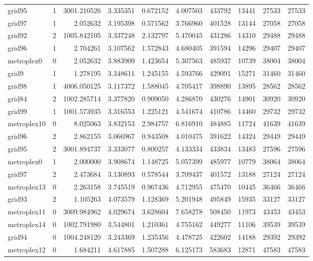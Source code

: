 \documentclass[../../../thesis.tex]{subfiles}
\begin{document}
\begin{longtable}{|l|r|r|r|r|r|r|r|r|r|}
grid95 & 1 & 3001.210526 & 3.335351 & 0.672152 & 4.007503 & 433792 & 13441 & 27533 & 27533 \\
grid97 & 1 & 2.052632 & 3.195398 & 0.571562 & 3.766960 & 401528 & 13144 & 27058 & 27058 \\
grid92 & 2 & 1005.842105 & 3.337248 & 2.132797 & 5.470045 & 431286 & 14310 & 29488 & 29488 \\
grid96 & 1 & 2.704261 & 3.107562 & 1.572843 & 4.680405 & 391594 & 14296 & 29407 & 29407 \\
metroplex0 & 0 & 2.052632 & 3.883909 & 1.423654 & 5.307563 & 485937 & 10739 & 38004 & 38004 \\
grid9 & 1 & 1.278195 & 3.348611 & 1.245155 & 4.593766 & 429091 & 15271 & 31460 & 31460 \\
grid98 & 1 & 4006.050125 & 3.117372 & 1.588045 & 4.705417 & 398890 & 13895 & 28562 & 28562 \\
grid84 & 2 & 1002.285714 & 3.377820 & 0.909050 & 4.286870 & 430276 & 14901 & 30920 & 30920 \\
grid99 & 1 & 1001.573935 & 3.316553 & 1.225121 & 4.541674 & 410786 & 14460 & 29732 & 29732 \\
metroplex10 & 0 & 8.025063 & 3.832153 & 2.984757 & 6.816910 & 484885 & 11724 & 41639 & 41639 \\
grid96 & 2 & 2.862155 & 3.066967 & 0.943508 & 4.010475 & 391622 & 14324 & 29449 & 29449 \\
grid95 & 2 & 3001.894737 & 3.333077 & 0.800257 & 4.133334 & 433834 & 13483 & 27596 & 27596 \\
metroplex0 & 1 & 2.000000 & 3.908674 & 1.148725 & 5.057399 & 485977 & 10779 & 38064 & 38064 \\
grid97 & 2 & 2.473684 & 3.130893 & 0.578544 & 3.709437 & 401572 & 13188 & 27124 & 27124 \\
metroplex13 & 0 & 2.263158 & 3.745519 & 0.967436 & 4.712955 & 475470 & 10445 & 36466 & 36466 \\
grid93 & 2 & 1.105263 & 4.073579 & 1.128369 & 5.201948 & 495849 & 15935 & 33127 & 33127 \\
metroplex11 & 0 & 3009.984962 & 4.029674 & 3.628604 & 7.658278 & 508450 & 11973 & 43453 & 43453 \\
metroplex14 & 0 & 1002.791980 & 3.544801 & 1.210361 & 4.755162 & 449277 & 11106 & 39539 & 39539 \\
grid94 & 0 & 1004.248120 & 3.243369 & 1.235356 & 4.478725 & 422602 & 14188 & 29392 & 29392 \\
metroplex12 & 0 & 1.684211 & 4.617885 & 1.507288 & 6.125173 & 583683 & 12871 & 47583 & 47583 \\

\end{longtable}
\end{document}
